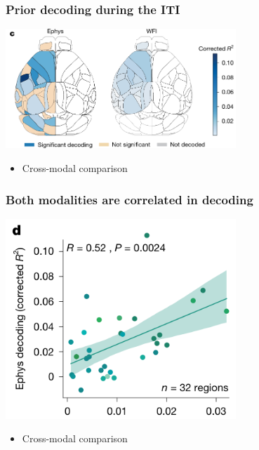 \documentclass{beamer}
\begin{document}
\begin{frame}
  \frametitle{Prior decoding during the ITI}
  \begin{center}
    \includegraphics[width=0.65\textwidth, keepaspectratio]{./figure2c}
  \end{center}
  \begin{itemize}
    \item Cross-modal comparison
  \end{itemize}
\end{frame}

\begin{frame}
  \frametitle{Both modalities are correlated in decoding}
  \begin{center}
    \includegraphics[width=0.65\textwidth, keepaspectratio]{./figure2d}
  \end{center}
  \begin{itemize}
    \item Cross-modal comparison
  \end{itemize}
\end{frame}
\end{document}
